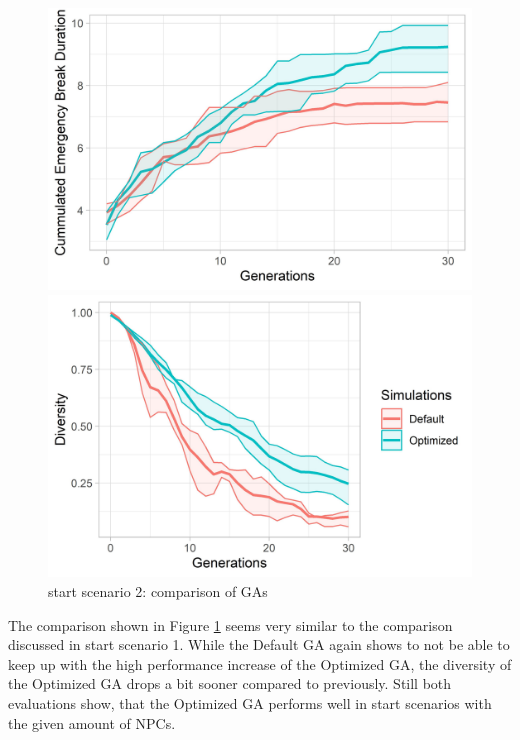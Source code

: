 \begin{figure}[ht] 
	\begin{minipage}[b]{0.5\linewidth}
		\centering
		\includegraphics[width=1\linewidth]{simulations/evaluation/plots/sim_2_ga_generations} 
	\end{minipage}%
	\begin{minipage}[b]{0.5\linewidth}
		\centering
		\includegraphics[width=1\linewidth]{simulations/evaluation/plots/sim_2_ga_diversity} 
	\end{minipage} 
	\caption{start scenario 2: comparison of GAs}
	\label{fig:evaluation:sim_2_ga_comparison}
\end{figure}

The comparison shown in Figure \ref{fig:evaluation:sim_2_ga_comparison} seems very similar to the comparison discussed in start scenario 1. While the Default GA again shows to not be able to keep up with the high performance increase of the Optimized GA, the diversity of the Optimized GA drops a bit sooner compared to previously. Still both evaluations show, that the Optimized GA performs well in start scenarios with the given amount of NPCs.

